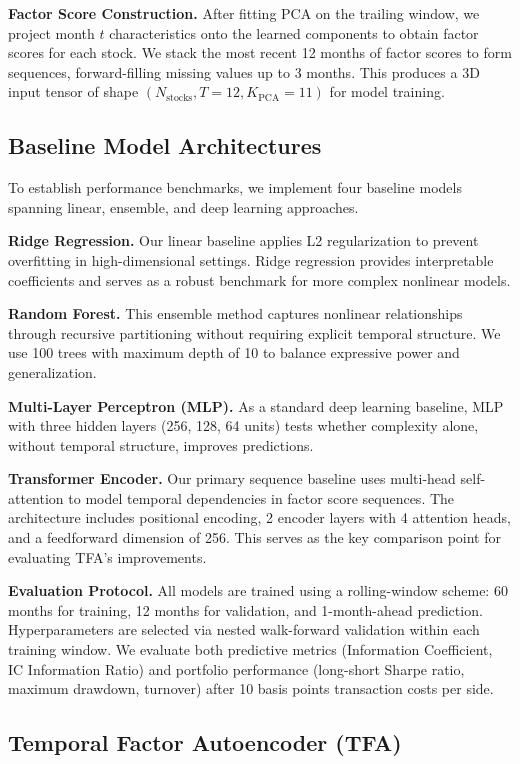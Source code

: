 \documentclass[12pt]{article}
\begin{document}
\textbf{Factor Score Construction.} After fitting PCA on the trailing window, we project month $t$ characteristics onto the learned components to obtain factor scores for each stock. We stack the most recent 12 months of factor scores to form sequences, forward-filling missing values up to 3 months. This produces a 3D input tensor of shape $(N_{\text{stocks}}, T=12, K_{\text{PCA}}=11)$ for model training.

\subsection{Baseline Model Architectures}

To establish performance benchmarks, we implement four baseline models spanning linear, ensemble, and deep learning approaches.

\textbf{Ridge Regression.} Our linear baseline applies L2 regularization to prevent overfitting in high-dimensional settings. Ridge regression provides interpretable coefficients and serves as a robust benchmark for more complex nonlinear models.

\textbf{Random Forest.} This ensemble method captures nonlinear relationships through recursive partitioning without requiring explicit temporal structure. We use 100 trees with maximum depth of 10 to balance expressive power and generalization.

\textbf{Multi-Layer Perceptron (MLP).} As a standard deep learning baseline, MLP with three hidden layers (256, 128, 64 units) tests whether complexity alone, without temporal structure, improves predictions.

\textbf{Transformer Encoder.} Our primary sequence baseline uses multi-head self-attention to model temporal dependencies in factor score sequences. The architecture includes positional encoding, 2 encoder layers with 4 attention heads, and a feedforward dimension of 256. This serves as the key comparison point for evaluating TFA's improvements.

\textbf{Evaluation Protocol.} All models are trained using a rolling-window scheme: 60 months for training, 12 months for validation, and 1-month-ahead prediction. Hyperparameters are selected via nested walk-forward validation within each training window. We evaluate both predictive metrics (Information Coefficient, IC Information Ratio) and portfolio performance (long-short Sharpe ratio, maximum drawdown, turnover) after 10 basis points transaction costs per side.

\subsection{Temporal Factor Autoencoder (TFA)}
\end{document}
